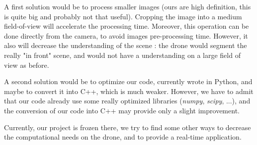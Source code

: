 A first solution would be to process smaller images (ours are high definition, this is quite big and probably not that useful). Cropping the image into a medium field-of-view will accelerate the processing time. Moreover, this operation can be done directly from the camera, to avoid images pre-processing time. However, it also will decrease the understanding of the scene : the drone would segment the really "in front" scene, and would not have a understanding on a large field of view as before.

A second solution would be to optimize our code, currently wrote in Python, and maybe to convert it into C++, which is much weaker. However, we have to admit that our code already use some really optimized libraries (\textit{numpy}, \textit{scipy}, ...), and the conversion of our code into C++ may provide only a slight improvement.

Currently, our project is frozen there, we try to find some other ways to decrease the computational needs on the drone, and to provide a real-time application.



